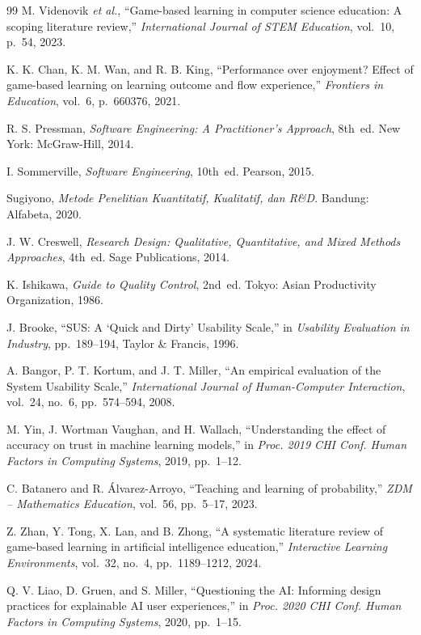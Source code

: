 \begin{thebibliography}{99}
M. Videnovik \textit{et al.}, ``Game-based learning in computer science education: A scoping literature review,'' \textit{International Journal of STEM Education}, vol.~10, p.~54, 2023.

K. K. Chan, K. M. Wan, and R. B. King, ``Performance over enjoyment? Effect of game-based learning on learning outcome and flow experience,'' \textit{Frontiers in Education}, vol.~6, p.~660376, 2021.

R. S. Pressman, \textit{Software Engineering: A Practitioner's Approach}, 8th~ed. New York: McGraw-Hill, 2014.

I. Sommerville, \textit{Software Engineering}, 10th~ed. Pearson, 2015.

Sugiyono, \textit{Metode Penelitian Kuantitatif, Kualitatif, dan R\&D}. Bandung: Alfabeta, 2020.

J. W. Creswell, \textit{Research Design: Qualitative, Quantitative, and Mixed Methods Approaches}, 4th~ed. Sage Publications, 2014.

K. Ishikawa, \textit{Guide to Quality Control}, 2nd~ed. Tokyo: Asian Productivity Organization, 1986.

J. Brooke, ``SUS: A `Quick and Dirty' Usability Scale,'' in \textit{Usability Evaluation in Industry}, pp.~189--194, Taylor \& Francis, 1996.

A. Bangor, P. T. Kortum, and J. T. Miller, ``An empirical evaluation of the System Usability Scale,'' \textit{International Journal of Human-Computer Interaction}, vol.~24, no.~6, pp.~574--594, 2008.

M. Yin, J. Wortman Vaughan, and H. Wallach, ``Understanding the effect of accuracy on trust in machine learning models,'' in \textit{Proc. 2019 CHI Conf. Human Factors in Computing Systems}, 2019, pp.~1--12.

C. Batanero and R. \'Alvarez-Arroyo, ``Teaching and learning of probability,'' \textit{ZDM -- Mathematics Education}, vol.~56, pp.~5--17, 2023.

Z. Zhan, Y. Tong, X. Lan, and B. Zhong, ``A systematic literature review of game-based learning in artificial intelligence education,'' \textit{Interactive Learning Environments}, vol.~32, no.~4, pp.~1189--1212, 2024.

Q. V. Liao, D. Gruen, and S. Miller, ``Questioning the AI: Informing design practices for explainable AI user experiences,'' in \textit{Proc. 2020 CHI Conf. Human Factors in Computing Systems}, 2020, pp.~1--15.


\end{thebibliography}
